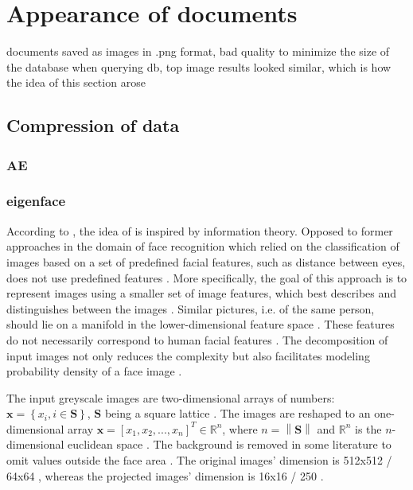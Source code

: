 \section{Appearance of documents}\label{sec:appearance}
documents saved as images in .png format, bad quality to minimize the size of the database
when querying db, top image results looked similar, which is how the idea of this section arose

\subsection{Compression of data}\label{subsec:compression}
\subsubsection{AE}\label{subsec:autoencoder}

\subsubsection{eigenface}\label{subsec:eigenface}

According to \citeauthor{eigenfaces1991}, the idea of \eigenfaces{} is inspired by information theory.
Opposed to former approaches in the domain of face recognition which relied on the classification of images based on a set of predefined facial features, such as distance between eyes,
\eigenfaces{} does not use predefined features \cite{eigenfaces1991}.
More specifically, the goal of this approach is to represent images using a smaller set of image features, which best describes and distinguishes between the images \cite{eigenfaces1991, eigenfaces2013}.
Similar pictures, i.e. of the same person, should lie on a manifold in the lower-dimensional feature space \cite{face-recognition2008}.
These features do not necessarily correspond to human facial features \cite{eigenfaces1991}.
The decomposition of input images not only reduces the complexity but also facilitates modeling probability density of a face image \cite{face-recognition2008}.

The input greyscale images are two-dimensional arrays of numbers: $\textbf{x} = \left\{ x_i, i \in \textbf{S} \right\}$, $\textbf{S}$ being a square lattice \cite{eigenfaces1997, eigenfaces1991}.
The images are reshaped to an one-dimensional array $\textbf{x} = \left[x_1, x_2, ..., x_n  \right]^{T} \in \mathbb{R}^{n}$, 
where $n = \left\| \textbf{S} \right\|$ and $\mathbb{R}^{n}$ is the $n$-dimensional euclidean space \cite{eigenfaces1997}.
The background is removed in some literature to omit values outside the face area \cite{eigenfaces1991}.
The original images' dimension is 512x512 \cite{eigenfaces1991}/ 64x64 \cite{face-recognition2020}, whereas the projected images' dimension is 16x16 \cite{eigenfaces1991}/ 250 \cite{face-recognition2020}.


